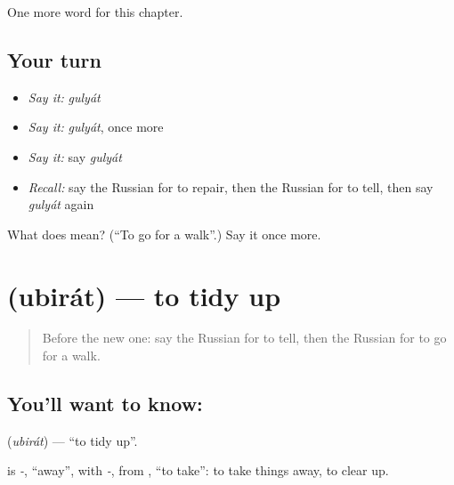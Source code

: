 \begin{grammarlens}[title={What you've built}]
One more word for this chapter.
\end{grammarlens}

\subsection*{Your turn}
\begin{itemize}
\raggedright
  \item \emph{Say it:} \emph{gulyát}
  \item \emph{Say it:} \emph{gulyát}, once more
  \item \emph{Say it:} say \emph{gulyát}
  \item \emph{Recall:} say the Russian for to repair, then the Russian for to tell, then say \emph{gulyát} again
\end{itemize}

\begin{tcolorbox}[breakable,colback=teal!4,colframe=teal!35!black,title={Before you move on}]
What does  mean? (\textquotedblleft{}To go for a walk\textquotedblright{}.) Say it once more.
\end{tcolorbox}
\section[\texorpdfstring{\ru{убирать} (ubirát)}{убирать (ubirát)}]{ (ubirát) — to tidy up}

\label{lesson:RU-C134-to-tidy-up}



\begin{quote}
Before the new one: say the Russian for to tell, then the Russian for to go for a walk.
\end{quote}

\subsection*{You'll want to know: }
\textbf{} (\emph{ubirát}) — \textquotedblleft{}to tidy up\textquotedblright{}.

\begin{cousinweb}
\textbf{} is \emph{-}, \textquotedblleft{}away\textquotedblright{}, with \emph{-}, from \emph{}, \textquotedblleft{}to take\textquotedblright{}: to take things away, to clear up.
\end{cousinweb}

